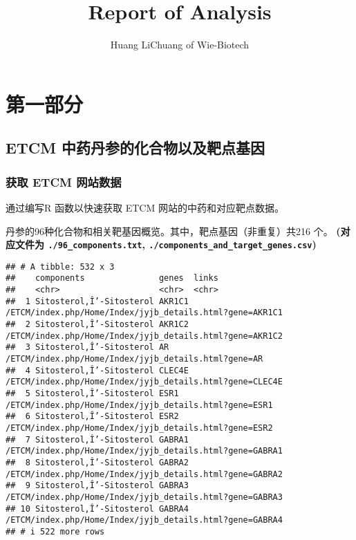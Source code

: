 \documentclass[
]{article}
\title{Report of Analysis}
\author{Huang LiChuang of Wie-Biotech}
\date{}
\begin{document}
\maketitle

{
\setcounter{tocdepth}{3}
\tableofcontents
}
\hypertarget{ux7b2cux4e00ux90e8ux5206}{%
\section{第一部分}\label{ux7b2cux4e00ux90e8ux5206}}

\hypertarget{etcm-ux4e2dux836fux4e39ux53c2ux7684ux5316ux5408ux7269ux4ee5ux53caux9776ux70b9ux57faux56e0}{%
\subsection{ETCM 中药丹参的化合物以及靶点基因}\label{etcm-ux4e2dux836fux4e39ux53c2ux7684ux5316ux5408ux7269ux4ee5ux53caux9776ux70b9ux57faux56e0}}

\hypertarget{ux83b7ux53d6-etcm-ux7f51ux7ad9ux6570ux636e}{%
\subsubsection{获取 ETCM 网站数据}\label{ux83b7ux53d6-etcm-ux7f51ux7ad9ux6570ux636e}}

通过编写R 函数以快速获取 ETCM 网站的中药和对应靶点数据。

丹参的96种化合物和相关靶基因概览。其中，靶点基因（非重复）共216 个。
\textbf{(对应文件为 \texttt{./96\_components.txt}, \texttt{./components\_and\_target\_genes.csv})}

\begin{verbatim}
## # A tibble: 532 x 3
##    components               genes  links                                                   
##    <chr>                    <chr>  <chr>                                                   
##  1 Sitosterol,Î’-Sitosterol AKR1C1 /ETCM/index.php/Home/Index/jyjb_details.html?gene=AKR1C1
##  2 Sitosterol,Î’-Sitosterol AKR1C2 /ETCM/index.php/Home/Index/jyjb_details.html?gene=AKR1C2
##  3 Sitosterol,Î’-Sitosterol AR     /ETCM/index.php/Home/Index/jyjb_details.html?gene=AR    
##  4 Sitosterol,Î’-Sitosterol CLEC4E /ETCM/index.php/Home/Index/jyjb_details.html?gene=CLEC4E
##  5 Sitosterol,Î’-Sitosterol ESR1   /ETCM/index.php/Home/Index/jyjb_details.html?gene=ESR1  
##  6 Sitosterol,Î’-Sitosterol ESR2   /ETCM/index.php/Home/Index/jyjb_details.html?gene=ESR2  
##  7 Sitosterol,Î’-Sitosterol GABRA1 /ETCM/index.php/Home/Index/jyjb_details.html?gene=GABRA1
##  8 Sitosterol,Î’-Sitosterol GABRA2 /ETCM/index.php/Home/Index/jyjb_details.html?gene=GABRA2
##  9 Sitosterol,Î’-Sitosterol GABRA3 /ETCM/index.php/Home/Index/jyjb_details.html?gene=GABRA3
## 10 Sitosterol,Î’-Sitosterol GABRA4 /ETCM/index.php/Home/Index/jyjb_details.html?gene=GABRA4
## # i 522 more rows
\end{verbatim}
\end{document}

